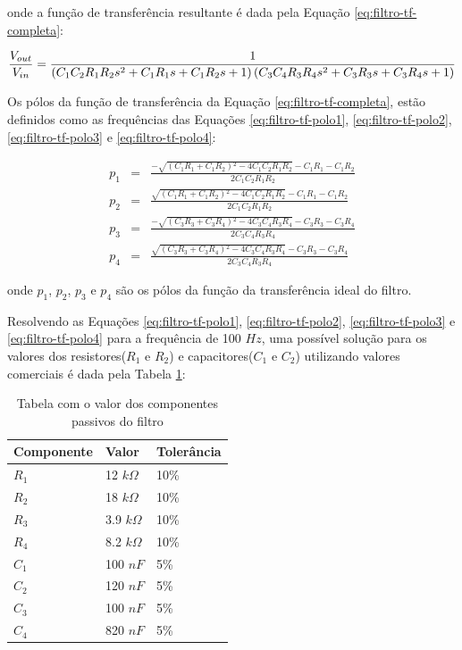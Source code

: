 \documentclass[a4paper]{instrumentacao}
\begin{document}
\noindent
onde a função de transferência resultante é dada pela Equação \ref{eq:filtro-tf-completa}:

\begin{equation}
	\small
	\frac{V_{out}}{V_{in}} = \frac{1}{\left(C_1 C_2 R_1 R_2 s^2+C_1 R_1 s+C_1 R_2 s+1\right) \left(C_3 C_4 R_3 R_4
   s^2+C_3 R_3 s+C_3 R_4 s+1\right)}
	\label{eq:filtro-tf-completa}
\end{equation}

Os pólos da função de transferência da Equação \ref{eq:filtro-tf-completa}, estão definidos como as frequências das Equações \ref{eq:filtro-tf-polo1}, \ref{eq:filtro-tf-polo2}, \ref{eq:filtro-tf-polo3} e \ref{eq:filtro-tf-polo4}:

\begin{eqnarray}
	p_{1} &=& \frac{-\sqrt{\left(C_1 R_1+C_1 R_2\right){}^2-4 C_1 C_2 R_1 R_2}-C_1 R_1-C_1 R_2}{2 C_1 C_2 R_1 R_2} \label{eq:filtro-tf-polo1} \\
	p_{2} &=& \frac{\sqrt{\left(C_1 R_1+C_1 R_2\right){}^2-4 C_1 C_2 R_1 R_2}-C_1 R_1-C_1 R_2}{2 C_1 C_2 R_1 R_2} \label{eq:filtro-tf-polo2} \\
	p_{3} &=& \frac{-\sqrt{\left(C_3 R_3+C_3 R_4\right){}^2-4 C_3 C_4 R_3 R_4}-C_3 R_3-C_3 R_4}{2 C_3 C_4 R_3 R_4} \label{eq:filtro-tf-polo3} \\
	p_{4} &=& \frac{\sqrt{\left(C_3 R_3+C_3 R_4\right){}^2-4 C_3 C_4 R_3 R_4}-C_3 R_3-C_3 R_4}{2 C_3 C_4 R_3 R_4}\label{eq:filtro-tf-polo4} 
\end{eqnarray}

\noindent
onde $p_1$, $p_2$, $p_3$ e $p_4$ são os pólos da função da transferência ideal do filtro.

Resolvendo as Equações \ref{eq:filtro-tf-polo1}, \ref{eq:filtro-tf-polo2}, \ref{eq:filtro-tf-polo3} e \ref{eq:filtro-tf-polo4} para a frequência de 100 $Hz$, uma possível solução para os valores dos resistores($R_1$ e $R_2$) e capacitores($C_1$ e $C_2$) utilizando valores comerciais é dada pela Tabela \ref{tab:filtro-valores}:

\begin{table}[H]
\centering
\caption{Tabela com o valor dos componentes passivos do filtro}
\begin{tabular}{|l|l|l|}
 \hline
 \textbf{Componente} & \textbf{Valor} & \textbf{Tolerância} \\ \hline
 
 $R_1$ & 12 $k\Omega$ 	& 10\% \\ \hline
 $R_2$ & 18 $k\Omega$ 	& 10\% \\ \hline
 $R_3$ & 3.9 $k\Omega$ 	& 10\% \\ \hline
 $R_4$ & 8.2 $k\Omega$ 	& 10\% \\ \hline
 
 $C_1$ & 100 $nF$ 		& 5\% \\ \hline
 $C_2$ & 120 $nF$ 		& 5\% \\ \hline
 $C_3$ & 100 $nF$ 		& 5\% \\ \hline
 $C_4$ & 820 $nF$ 		& 5\% \\ \hline
  
\end{tabular}
\label{tab:filtro-valores}
\end{table}
\end{document}
